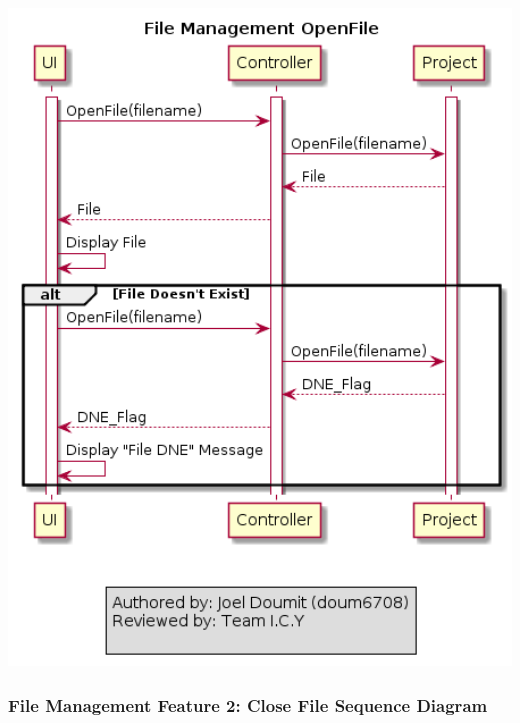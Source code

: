 \documentclass[twoside,letterpaper]{article}
\begin{document}
	\includegraphics[width=6.0in]{images/SequenceDiagrams/FM_OpenFile_Image}
	
	\newpage
	
	\subsubsection[File Management Feature 2: Close File Sequence Diagram]{\rmfamily\bfseries\color{black}
		File Management Feature 2: Close File Sequence Diagram}
	\hypertarget{RefHeading22059017292}{}
	
\end{document}
